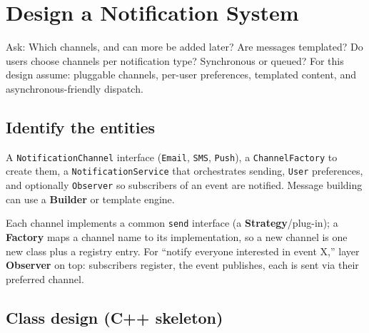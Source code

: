 \section{Design a Notification System}
\label{sec:case-notification}


\begin{patternbox}
Ask: Which channels, and can more be added later? Are messages templated?
Do users choose channels per notification type? Synchronous or queued? For
this design assume: pluggable channels, per-user preferences, templated
content, and asynchronous-friendly dispatch.
\end{patternbox}

\subsection*{Identify the entities}

A \texttt{NotificationChannel} interface (\texttt{Email}, \texttt{SMS},
\texttt{Push}), a \texttt{ChannelFactory} to create them, a
\texttt{NotificationService} that orchestrates sending, \texttt{User}
preferences, and optionally \texttt{Observer} so subscribers of an event
are notified. Message building can use a \textbf{Builder} or template
engine.

\begin{ideabox}
Each channel implements a common \texttt{send} interface (a
\textbf{Strategy}/plug-in); a \textbf{Factory} maps a channel name to its
implementation, so a new channel is one new class plus a registry entry.
For ``notify everyone interested in event X,'' layer \textbf{Observer} on
top: subscribers register, the event publishes, each is sent via their
preferred channel.
\end{ideabox}

\subsection*{Class design (C++ skeleton)}

